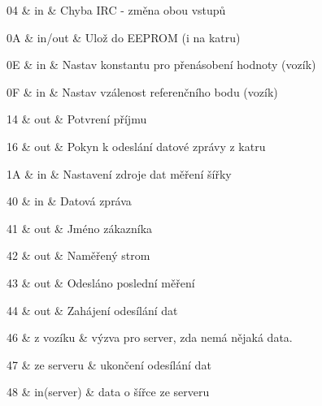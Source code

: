 \begin{DoxyItemize}
\item 04 \& in \& Chyba IRC -\/ změna obou vstupů
\item 0A \& in/out \& Ulož do EEPROM (i na katru)
\item 0E \& in \& Nastav konstantu pro přenásobení hodnoty (vozík)
\item 0F \& in \& Nastav vzálenost referenčního bodu (vozík)
\item 14 \& out \& Potvrení příjmu
\item 16 \& out \& Pokyn k odeslání datové zprávy z katru
\item 1A \& in \& Nastavení zdroje dat měření šířky
\item 40 \& in \& Datová zpráva
\item 41 \& out \& Jméno zákazníka
\item 42 \& out \& Naměřený strom
\item 43 \& out \& Odesláno poslední měření
\item 44 \& out \& Zahájení odesílání dat
\item 46 \& z vozíku \& výzva pro server, zda nemá nějaká data.
\item 47 \& ze serveru \& ukončení odesílání dat
\item 48 \& in(server) \& data o šířce ze serveru 
\end{DoxyItemize}